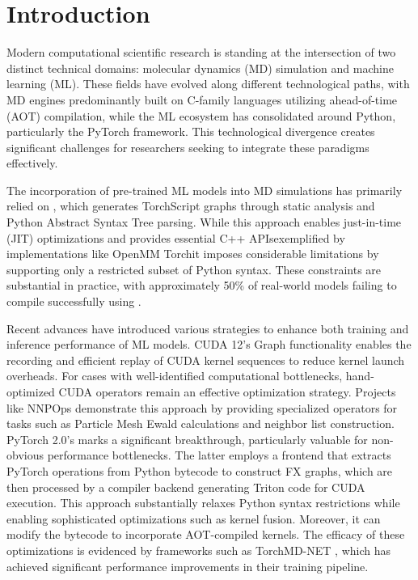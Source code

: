 \section{Introduction}

Modern computational scientific research is standing at the intersection
of two distinct technical domains:
molecular dynamics (MD) simulation and machine learning (ML).
These fields have evolved along different technological paths,
with MD engines predominantly built on C-family languages
utilizing ahead-of-time (AOT) compilation,
while the ML ecosystem has consolidated around Python,
particularly the PyTorch framework.
This technological divergence creates significant challenges for researchers
seeking to integrate these paradigms effectively.

The incorporation of pre-trained ML models into MD simulations
has primarily relied on \texttt{\torchjit},
which generates TorchScript graphs through static analysis
and Python Abstract Syntax Tree parsing.
While this approach enables just-in-time (JIT) optimizations
and provides essential C++ APIs\textemdash{}exemplified by implementations
like OpenMM Torch\cite{Eastman2024,Software-OpenMM-Torch}\textemdash{}it imposes considerable limitations
by supporting only a restricted subset of Python syntax.
These constraints are substantial in practice,
with approximately 50\% of real-world models failing to compile successfully
using \texttt{\torchjit} \cite{Ansel2024}.

Recent advances have introduced various strategies
to enhance both training and inference performance of ML models.
CUDA 12's Graph functionality enables the recording
and efficient replay of CUDA kernel sequences
to reduce kernel launch overheads.
For cases with well-identified computational bottlenecks,
hand-optimized CUDA operators remain an effective optimization strategy.
Projects like NNPOps \cite{Eastman2024,Software-NNPOps} demonstrate this approach
by providing specialized operators for tasks
such as Particle Mesh Ewald calculations and neighbor list construction.
PyTorch 2.0's \texttt{\torchcompile} \cite{Ansel2024} marks a significant breakthrough,
particularly valuable for non-obvious performance bottlenecks.
The latter employs a frontend that extracts PyTorch operations
from Python bytecode to construct FX graphs,
which are then processed by a compiler backend
generating Triton code for CUDA execution.
This approach substantially relaxes Python syntax restrictions
while enabling sophisticated optimizations such as kernel fusion.
Moreover, it can modify the bytecode to incorporate AOT-compiled kernels.
The efficacy of these optimizations is evidenced
by frameworks such as TorchMD-NET \cite{Pelaez2024},
which has achieved significant performance improvements
in their training pipeline.

